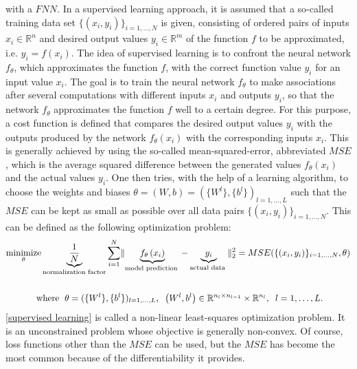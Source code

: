 with a $FNN$. In a supervised learning approach, it is assumed that a so-called training data set $\{ (x_i, y_i) \}_{i = 1, \ldots, N}$ is given, consisting of ordered pairs of inputs $x_i \in \mathbb{R}^n$ and desired output values $y_i \in \mathbb{R}^m$ of the function $f$ to be approximated, i.e. $y_i = f(x_i)$. The idea of supervised learning is to confront the neural network $f_{\theta}$, which approximates the function $f$, with the correct function value $y_i$ for an input value $x_i$. The goal is to train the neural network $f_{\theta}$ to make associations after several computations with different inputs $x_i$ and outputs $y_i$, so that the network $f_{\theta}$ approximates the function $f$ well to a certain degree. For this purpose, a cost function is defined that compares the desired output values $y_i$ with the outputs produced by the network $f_{\theta}(x_i)$ with the corresponding inputs $x_i$. This is generally achieved by using the so-called mean-squared-error, abbreviated $MSE$, which is the average squared difference between the generated values $f_{\theta}(x_i)$ and the actual values $y_i$. One then tries, with the help of a learning algorithm, to choose the weights and biases $\theta = (W, b) = (\{ W^l \}, \{ b^l \})_{l = 1, \ldots, L}$ such that the $MSE$ can be kept as small as possible over all data pairs $\{ (x_i, y_i) \}_{i = 1, \ldots, N}$. This can be defined as the following optimization problem:
\begin{equation}
    \label{supervised learning}
    \begin{gathered}
        \operatorname*{minimize}_{\theta} \underbrace{\frac{1}{N}}_{\text{normalization factor}} \sum_{i=1}^{N} \lVert \underbrace{ f_{\theta} \left(x_{i}\right)}_{\text{model prediction }} - \underbrace{y_{i}}_{\text{actual data }} \rVert^{2}_2 =  MSE(\{ (x_i, y_i) \}_{i = 1, \ldots, N}, \theta) \\
        \\
        \text{ where } \; \theta = (\{ W^l \}, \{ b^l \})_{l = 1, \ldots, L}, \; \; \left(W^{l}, b^{l}\right) \in \mathbb{R}^{n_l \times n_{l-1}} \times \mathbb{R}^{n_l}, \; \; l=1, \ldots, L .
    \end{gathered}
\end{equation}
\cref{supervised learning} is called a non-linear least-squares optimization problem. It is an unconstrained problem whose objective is generally non-convex. Of course, loss functions other than the $MSE$ can be used, but the $MSE$ has become the most common because of the differentiability it provides. \\
